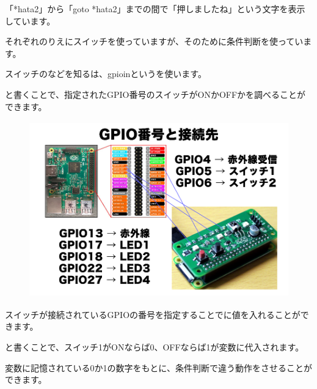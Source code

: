 「*hata2」から「goto *hata2」までの間で「押しましたね」という文字を表示しています。

それぞれのりえにスイッチを使っていますが、そのために条件判断を使っています。

スイッチのなどを知るは、gpioinというを使います。



\begin{description}
    \item {}
\end{description}

と書くことで、指定されたGPIO番号のスイッチがONかOFFかを調べることができます。



\begin{figure}[H]
    \begin{center}
      \includegraphics[keepaspectratio,width=12.409cm,height=7.62cm]{text04-img/s_gpio.png}
    \end{center}
    \label{fig:prog_menu}
\end{figure}



スイッチが接続されているGPIOの番号を指定することでに値を入れることができます。

\begin{description}
    \item {}
\end{description}



と書くことで、スイッチ1がONならば0、OFFならば1が変数に代入されます。

変数に記憶されている0か1の数字をもとに、条件判断で違う動作をさせることができます。

